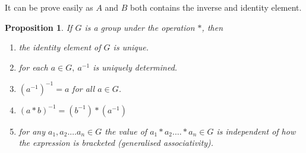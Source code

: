 \documentclass[12pt]{report}
\newtheorem{prop}{Proposition}
\begin{document}
It can be prove easily as $A$ and $B$ both contains the inverse and identity element.
\begin{prop}
    If $G$ is a group under the operation $*$, then 
    \begin{enumerate}
        \item the identity element of $G$ is unique.
        \item for each $a \in G,~ a^{-1}$ is uniquely determined.
        \item $(a^{-1})^{-1} = a$ for all $a \in G$.
        \item $(a*b)^{-1} = (b^{-1})*(a^{-1})$
        \item for any $a_1, a_2. \dots a_n \in G$ the value of $a_1 * a_2. \dots *a_n \in G$ is independent of how the expression is bracketed (generalised associativity).
    \end{enumerate}
\end{prop}
\end{document}
